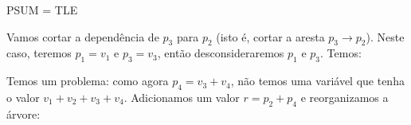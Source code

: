 \begin{frame}{PSUM = TLE}

    Vamos cortar a dependência de $p_3$ para $p_2$ (isto é, cortar a aresta $p_3 \to p_2$). Neste caso, teremos $p_1 = v_1$ e $p_3 = v_3$, então desconsideraremos $p_1$ e $p_3$. Temos:
    \begin{center}
    \end{center}
    
    Temos um problema: como agora $p_4 = v_3+v_4$, não temos uma variável que tenha o valor $v_1+v_2+v_3+v_4$. Adicionamos um valor $r = p_2 + p_4$ e reorganizamos a árvore:


\end{frame}
